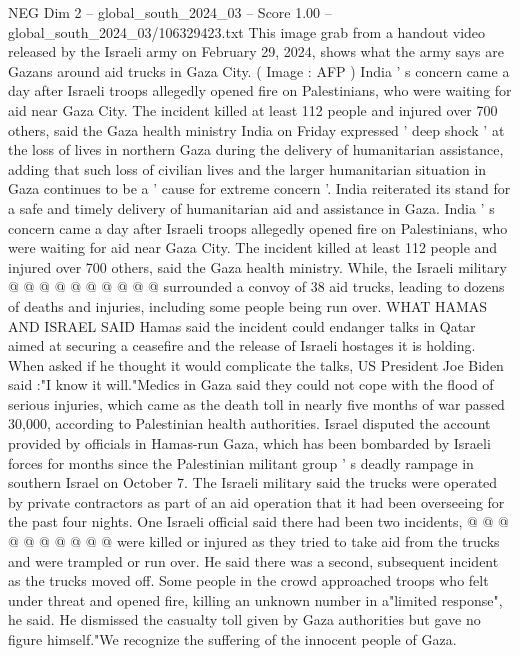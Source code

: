 \begin{textsample}{NEG Dim 2 – global\_south\_2024\_03 – Score 1.00 – global\_south\_2024\_03/106329423.txt}  \label{ex:f2_neg_106}
This image grab from a handout video released by the Israeli army on February 29, 2024, shows what the army says are Gazans around aid trucks in Gaza City. ( Image : AFP ) India ' s concern came a day after Israeli troops allegedly opened fire on Palestinians, who were waiting for aid near Gaza City.
The incident killed at least 112 people and injured over 700 others, said the Gaza health ministry India on Friday expressed ' deep shock ' at the loss of lives in northern Gaza during the delivery of humanitarian assistance, adding that such loss of civilian lives and the larger humanitarian situation in Gaza continues to be a ' cause for extreme concern '.
India reiterated its stand for a safe and timely delivery of humanitarian aid and assistance in Gaza.
India ' s concern came a day after Israeli troops allegedly opened fire on Palestinians, who were waiting for aid near Gaza City.
The incident killed at least 112 people and injured over 700 others, said the Gaza health ministry.
While, the Israeli military @ @ @ @ @ @ @ @ @ @ surrounded a convoy of 38 aid trucks, leading to dozens of deaths and injuries, including some people being run over.
WHAT HAMAS AND ISRAEL SAID Hamas said the incident could endanger talks in Qatar aimed at securing a ceasefire and the release of Israeli hostages it is holding.
When asked if he thought it would complicate the talks, US President Joe Biden said :"I know it will."Medics in Gaza said they could not cope with the flood of serious injuries, which came as the death toll in nearly five months of war passed 30,000, according to Palestinian health authorities.
Israel disputed the account provided by officials in Hamas-run Gaza, which has been bombarded by Israeli forces for months since the Palestinian militant group ' s deadly rampage in southern Israel on October 7.
The Israeli military said the trucks were operated by private contractors as part of an aid operation that it had been overseeing for the past four nights.
One Israeli official said there had been two incidents, @ @ @ @ @ @ @ @ @ @ were killed or injured as they tried to take aid from the trucks and were trampled or run over.
He said there was a second, subsequent incident as the trucks moved off.
Some people in the crowd approached troops who felt under threat and opened fire, killing an unknown number in a"limited response", he said.
He dismissed the casualty toll given by Gaza authorities but gave no figure himself."We recognize the suffering of the innocent people of Gaza.

\end{textsample}
